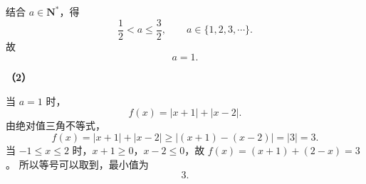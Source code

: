 \begin{answer}
结合 $a\in\mathbf N^*$，得
\nopagebreak[4]
\[\frac12<a\leqslant\frac32,\qquad a\in\{1,2,3,\cdots\}.\]
故
\nopagebreak[4]
\[a=1.\]

\textbf{（2）}

当 $a=1$ 时，
\nopagebreak[4]
\[f(x)=|x+1|+|x-2|.\]
由绝对值三角不等式，
\nopagebreak[4]
\[f(x)=|x+1|+|x-2|\geqslant|(x+1)-(x-2)|=|3|=3.\]
当 $-1\leqslant x\leqslant2$ 时，$x+1\geqslant0$，$x-2\leqslant0$，故 $f(x)=(x+1)+(2-x)=3$。
所以等号可以取到，最小值为
\nopagebreak[4]
\[3.\]



\end{answer}